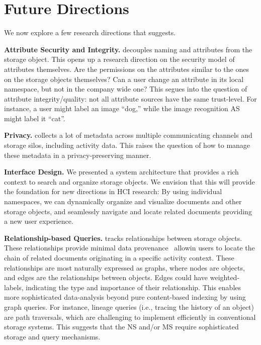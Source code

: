 \section{Future Directions}
\label{sec:future}
We now explore a few research directions that \system suggests.

\noindent\textbf{Attribute Security and Integrity.}
\system decouples naming and attributes from the storage object. This opens up a research direction on the security model of attributes themselves. Are the permissions on the attributes similar to the ones on the storage objects themselves? Can a user change an attribute in its local namespace, but not in the company wide one? This segues into the question of attribute integrity/quality: not all attribute sources have the same trust-level. For instance, a user might label an image ``dog,'' while the image recognition AS might label it ``cat''.

\noindent\textbf{Privacy.}
\system collects a lot of metadata across multiple communicating channels and storage silos, including activity data. This raises the question of how to manage these metadata in a privacy-preserving manner.

\noindent\textbf{Interface Design.}
We presented a system architecture that provides a rich context to search and organize storage objects. We envision that this will provide the foundation for new directions in HCI research: By using individual namespaces, we can dynamically organize and visualize documents and other storage objects, and seamlessly navigate and locate related documents providing a new user
experience.

\noindent\textbf{Relationship-based Queries.}
\system tracks relationships between storage objects. These relationships provide minimal data provenance~\cite{provprimer} allowin users to locate the chain of related documents originating in a specific activity context.
These relationships are most naturally expressed as graphs, where nodes are objects, and edges are the relationships between objects. Edges could have weighted-labels, indicating the type and importance of their relationship. 
This enables more sophisticated data-analysis beyond pure content-based indexing by using graph queries. 
For instance, lineage queries (i.e., tracing the history of an object) are path traversals, which are challenging to implement efficiently in conventional storage systems. This suggests that the NS and/or MS require sophisticated storage and query mechanisms.